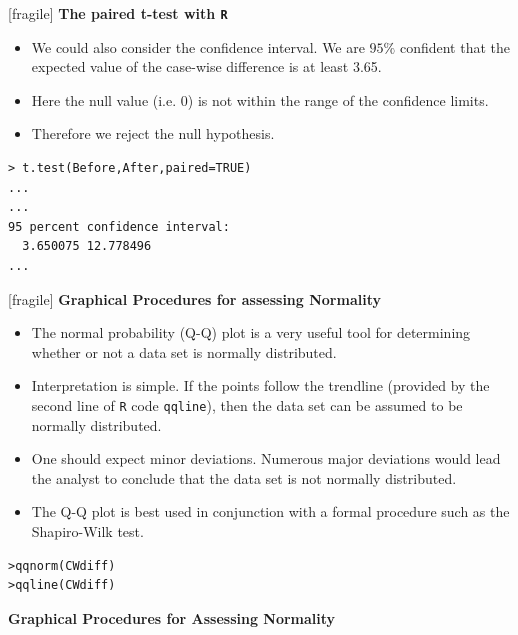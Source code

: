 \documentclass[a4]{beamer}
\begin{document}
[fragile]
\noindent \textbf{The paired t-test with \texttt{R}}
\begin{itemize}
\item We could also consider the confidence interval. We are $95\%$ confident that the expected value of the case-wise difference is at least 3.65.
\item Here the null value (i.e. 0) is not within the range of the confidence limits.
\item Therefore we reject the null hypothesis.
\end{itemize}
\begin{verbatim}
> t.test(Before,After,paired=TRUE)
...
...
95 percent confidence interval:
  3.650075 12.778496
...
\end{verbatim}







[fragile]
\noindent \textbf{Graphical Procedures for assessing Normality}

\begin{itemize}
\item The normal probability (Q-Q) plot is a very useful tool for determining whether or not a data set is normally distributed.
\item Interpretation is simple. If the points follow the trendline (provided by the second line of \texttt{R} code \texttt{qqline}), then the data set can be assumed to be normally distributed.
\item One should expect minor deviations. Numerous major deviations would lead the analyst to conclude that the data set is not normally distributed.
\item The Q-Q plot is best used in conjunction with a formal procedure such as the Shapiro-Wilk test.
\end{itemize}

\begin{verbatim}
>qqnorm(CWdiff)
>qqline(CWdiff)
\end{verbatim}





\noindent \textbf{Graphical Procedures for Assessing Normality}
\end{document}
